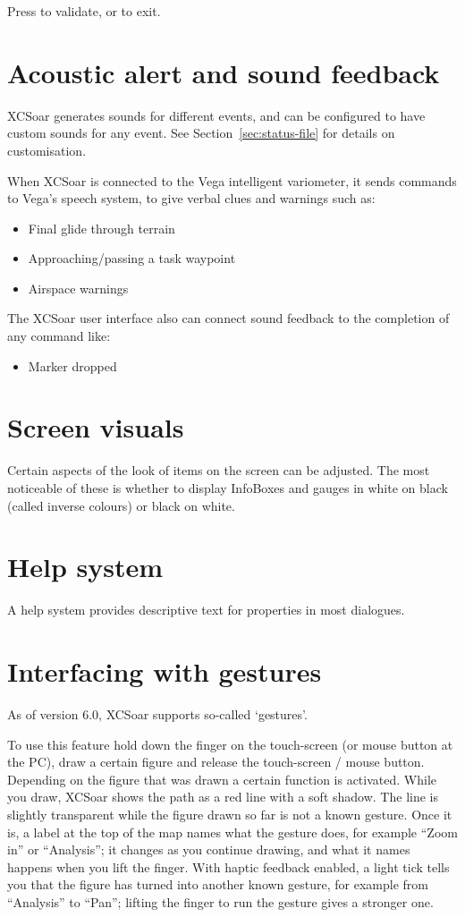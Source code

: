 Press  to validate, or  to exit.


\section{Acoustic alert and sound feedback}

XCSoar generates sounds for different events, and can be configured to
have custom sounds for any event.  See Section~\ref{sec:status-file} for
details on customisation.

When XCSoar is connected to the Vega intelligent variometer, it sends
commands to Vega's speech system, to give verbal clues and warnings such as:
\begin{itemize}
\item Final glide through terrain
\item Approaching/passing a task waypoint
\item Airspace warnings
\end{itemize}

The XCSoar user interface also can connect sound feedback to the completion 
of any command like:
\begin{itemize}
\item Marker dropped
\end{itemize}


\section{Screen visuals}

Certain aspects of the look of items on the screen can be adjusted.
The most noticeable of these is whether to display InfoBoxes and
gauges in white on black (called inverse colours) or black on white.


\section{Help system}

A help system provides descriptive text for properties in most
dialogues.

\section{Interfacing with gestures}\label{sec:gestures}
As of version 6.0, XCSoar supports so-called `gestures'.

To use this feature hold down the finger on the 
touch-screen (or mouse button at the PC), draw a certain figure and release 
the touch-screen / mouse button. Depending on the figure that was drawn 
a certain function is activated. 
While you draw, XCSoar shows the path as a red line with a soft
shadow.  The line is slightly transparent while the figure drawn so
far is not a known gesture.  Once it is, a label at the top of the map names
what the gesture does, for example ``Zoom in'' or ``Analysis''; it
changes as you continue drawing, and what it names happens when you
lift the finger.  With haptic feedback enabled, a light tick tells you
that the figure has turned into another known gesture, for example
from ``Analysis'' to ``Pan''; lifting the finger to run the gesture
gives a stronger one.

